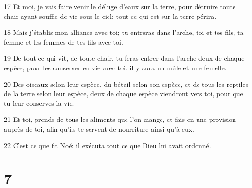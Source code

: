 \par 17 Et moi, je vais faire venir le déluge d'eaux sur la terre, pour détruire toute chair ayant souffle de vie sous le ciel; tout ce qui est sur la terre périra.
\par 18 Mais j'établis mon alliance avec toi; tu entreras dans l'arche, toi et tes fils, ta femme et les femmes de tes fils avec toi.
\par 19 De tout ce qui vit, de toute chair, tu feras entrer dans l'arche deux de chaque espèce, pour les conserver en vie avec toi: il y aura un mâle et une femelle.
\par 20 Des oiseaux selon leur espèce, du bétail selon son espèce, et de tous les reptiles de la terre selon leur espèce, deux de chaque espèce viendront vers toi, pour que tu leur conserves la vie.
\par 21 Et toi, prends de tous les aliments que l'on mange, et fais-en une provision auprès de toi, afin qu'ils te servent de nourriture ainsi qu'à eux.
\par 22 C'est ce que fit Noé: il exécuta tout ce que Dieu lui avait ordonné.

\chapter{7}

